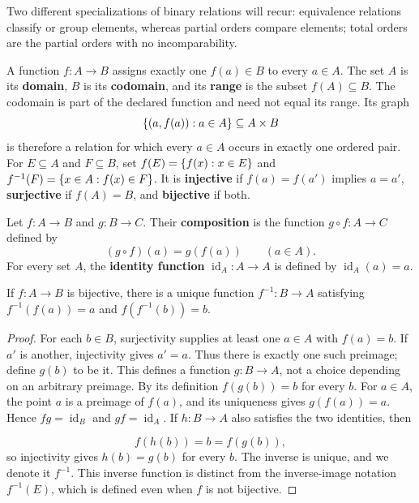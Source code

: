Two different specializations of binary relations will recur:
equivalence relations classify or group elements, whereas partial orders
compare elements; total orders are the partial orders with no
incomparability.

\begin{definition}
\label{def:function-image}
A function $f:A\to B$ assigns exactly one $f(a)\in B$ to every $a\in A$.
The set \(A\) is its \textbf{domain}, \(B\) is its \textbf{codomain}, and
its \textbf{range} is the subset \(f(A)\subseteq B\). The codomain is part
of the declared function and need not equal its range.
Its graph
\[
\left\{(a,f(a)):a\in A\right\}\subseteq A\times B
\]
is therefore a relation for which every $a\in A$ occurs in exactly one
ordered pair. For $E\subseteq A$ and $F\subseteq B$, set $f(E)=\left\{f(x):x\in E\right\}$ and $f^{-1}(F)=\left\{x\in A:f(x)\in F\right\}$. It is \textbf{injective} if $f(a)=f(a')$ implies $a=a'$, \textbf{surjective} if $f(A)=B$, and \textbf{bijective} if both.
\end{definition}

\begin{definition}
\label{def:composition}
Let $f:A\to B$ and $g:B\to C$. Their \textbf{composition} is the function $g\circ f:A\to C$ defined by
\[
(g\circ f)(a)=g(f(a))\qquad(a\in A).
\]
For every set $A$, the \textbf{identity function} $\operatorname{id}_A:A\to A$ is defined by $\operatorname{id}_A(a)=a$.
\end{definition}

\begin{theorem}
\label{thm:inverse-function}
If $f:A\to B$ is bijective, there is a unique function $f^{-1}:B\to A$ satisfying $f^{-1}(f(a))=a$ and $f(f^{-1}(b))=b$.
\end{theorem}
\begin{proof}
For each $b\in B$, surjectivity supplies at least one $a\in A$ with
$f(a)=b$. If $a'$ is another, injectivity gives $a'=a$. Thus there is
exactly one such preimage; define $g(b)$ to be it. This defines a function
$g:B\to A$, not a choice depending on an arbitrary preimage.
By its definition $f(g(b))=b$ for every $b$. For $a\in A$, the point $a$
is a preimage of $f(a)$, and its uniqueness gives $g(f(a))=a$.
Hence $fg=\operatorname{id}_B$ and $gf=\operatorname{id}_A$.
If $h:B\to A$ also satisfies the two identities, then

\[
f(h(b))=b=f(g(b)),
\]
 so injectivity gives $h(b)=g(b)$ for every $b$.
The inverse is unique, and we denote it $f^{-1}$.
This inverse function is distinct from the inverse-image notation
$f^{-1}(E)$, which is defined even when $f$ is not bijective.
\end{proof}

